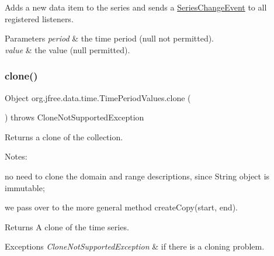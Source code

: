 Adds a new data item to the series and sends a \mbox{\hyperlink{}{Series\+Change\+Event}} to all registered listeners.


\begin{DoxyParams}{Parameters}
{\em period} & the time period ({\ttfamily null} not permitted). \\
\hline
{\em value} & the value ({\ttfamily null} permitted). \\
\hline
\end{DoxyParams}
\mbox{\label{classorg_1_1jfree_1_1data_1_1time_1_1_time_period_values_aca2830b9dd4583e26362fe7ac7e1a107}} 
\subsubsection{\texorpdfstring{clone()}{clone()}}
{\footnotesize\ttfamily Object org.\+jfree.\+data.\+time.\+Time\+Period\+Values.\+clone (\begin{DoxyParamCaption}{ }\end{DoxyParamCaption}) throws Clone\+Not\+Supported\+Exception}

Returns a clone of the collection. 

Notes\+: 
\begin{DoxyItemize}
\item no need to clone the domain and range descriptions, since String object is immutable; 
\item we pass over to the more general method create\+Copy(start, end).  
\end{DoxyItemize}

\begin{DoxyReturn}{Returns}
A clone of the time series.
\end{DoxyReturn}

\begin{DoxyExceptions}{Exceptions}
{\em Clone\+Not\+Supported\+Exception} & if there is a cloning problem. \\
\hline
\end{DoxyExceptions}
\mbox{\label{classorg_1_1jfree_1_1data_1_1time_1_1_time_period_values_ac8ac587986692f14e663155e22154f4e}} 

